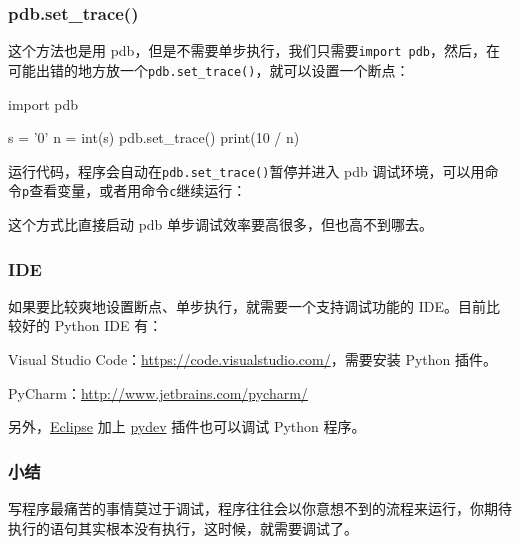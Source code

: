 \hypertarget{pdb.set_trace}{%
\subsubsection{pdb.set\_trace()}\label{pdb.set_trace}}

这个方法也是用
pdb，但是不需要单步执行，我们只需要\texttt{import\ pdb}，然后，在可能出错的地方放一个\texttt{pdb.set\_trace()}，就可以设置一个断点：

\begin{pythoncode}
import pdb

s = '0'
n = int(s)
pdb.set_trace() 
print(10 / n)
\end{pythoncode}

运行代码，程序会自动在\texttt{pdb.set\_trace()}暂停并进入 pdb
调试环境，可以用命令\texttt{p}查看变量，或者用命令\texttt{c}继续运行：


这个方式比直接启动 pdb 单步调试效率要高很多，但也高不到哪去。

\hypertarget{ide}{%
\subsubsection{IDE}\label{ide}}

如果要比较爽地设置断点、单步执行，就需要一个支持调试功能的
IDE。目前比较好的 Python IDE 有：

Visual Studio Code：\url{https://code.visualstudio.com/}，需要安装
Python 插件。

PyCharm：\url{http://www.jetbrains.com/pycharm/}

另外，\href{http://www.eclipse.org/}{Eclipse} 加上
\href{http://pydev.org/}{pydev} 插件也可以调试 Python 程序。

\hypertarget{ux5c0fux7ed3}{%
\subsubsection{小结}\label{ux5c0fux7ed3}}

写程序最痛苦的事情莫过于调试，程序往往会以你意想不到的流程来运行，你期待执行的语句其实根本没有执行，这时候，就需要调试了。

